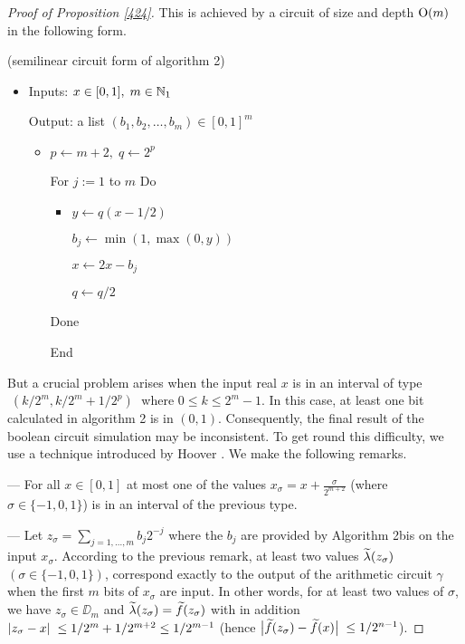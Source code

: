 \begin{proof}[Proof of Proposition \ref{424}]
\sni This is achieved by a circuit of size and depth ${\rm O}(m)$ in the following form.

 (semilinear circuit form of algorithm 2)
\begin{itemize}

\item [] 

Inputs: $ x \in [0,1], \; m \in \mathbb {N}_1$ 

\noindent 
 Output: a list $(b_1, b_2,\ldots, b_m) \in [ 0,1 ]^m$ 
	\begin{itemize}
	 
\item [] 

$p \leftarrow m+2 , \; q \leftarrow 2^p$ 

\noindent 
			 For $j:=1$ to $m$ Do
				\begin{itemize}
			 
\item [] 

$y \leftarrow q(x-1/2)$ 

\noindent 
			 		 $ b_j \leftarrow \min (1, \max(0,y))$ 

\noindent 
					$x \leftarrow 2x - b_j$ 

\noindent 
 				 $q \leftarrow q/2$
				 \end{itemize}
	 Done 

\noindent 
 	End
	 \end{itemize}
\end{itemize}

\sni But a crucial problem arises when the input real $x$ is in 
an interval of type $\;  (k/2^m, k/2^m + 1/2^p) \; $ where 
$0 \leq k \leq 2^m-1$. In this case, at least one bit calculated in algorithm 2 
is in $(0,1)$. Consequently, the final result of the 
boolean circuit simulation may be inconsistent. 
To get round this difficulty, we use a technique introduced by 
Hoover \cite{Ho87,Ho90}. We make the following remarks.

\noindent 
--- For all $x \in [0,1]$ at most one of the values 
$x_{\sigma} = x + \frac \sigma   {2^{m+2}}$ (where $ \sigma \in \{-1, 0, 1 \} $) is in an interval of the previous type.

\noindent 
--- Let $z_{\sigma} = \sum_{j=1,\ldots,m}b_j2^{-j}$ where the $b_j$ are 
provided by Algorithm 2bis on the input $x_{\sigma}$. According to the 
previous remark, at least two values 
$\widetilde {\lambda}(z_{\sigma})$ $(\sigma \in \{-1,0,1\})$, 
correspond exactly to the output of the arithmetic circuit $\gamma$ 
when the first $m$ bits of $x_{\sigma}$ are input. 
In other words, for at least two values of $ \sigma $, we have $ z_{ \sigma } \in 
\DD_m $ and 
$\widetilde \lambda(z_{\sigma}) = \widetilde{f}(z_{\sigma})$ with in addition
 $\left|{ z_{\sigma} - x }\right|\;  \leq 1/2^m + 1/2^{m+2} \leq 1/2^{m-1}$ 
	(hence $\big|{ \widetilde{f}(z_{\sigma}) - \widetilde{f}(x) }\big|\;  \leq 1/2^{n-1}$).


\end{proof}
